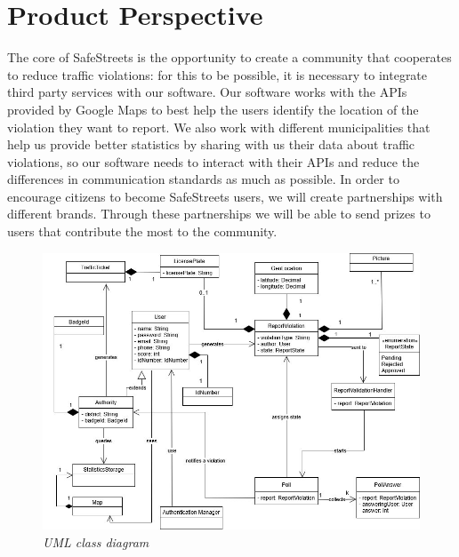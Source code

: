 \section{Product Perspective}
The core of SafeStreets is the opportunity to create a community that cooperates to reduce traffic violations: for this to be possible, it is necessary to integrate third party services with our software. 
Our software works with the APIs provided by Google Maps to best help the users identify the location of the violation they want to report.
We also work with different municipalities that help us provide better statistics by sharing with us their data about traffic violations, so our software needs to interact with their APIs and reduce the differences in communication standards as much as possible.
In order to encourage citizens to become SafeStreets users, we will create partnerships with different brands. Through these partnerships we will be able to send prizes to users that contribute the most to the community.

\begin{figure}[h]
  \centering
  \includegraphics[width=\textwidth]{RASD_Images/uml.jpg}
  \caption{\textit{UML class diagram}}
\end{figure}
\newpage